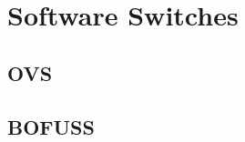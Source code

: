 \section{Software Switches }
\label{sec:softSwitchs}

\subsection{OVS}
\label{subsec:OVS}

\subsection{BOFUSS}
\label{subsec:BOFUSS}
